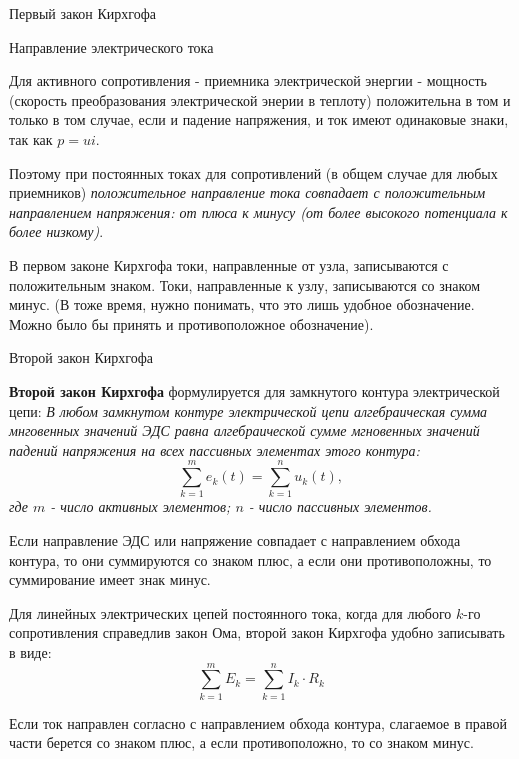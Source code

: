 \documentclass[10pt, pdf, hyperref={unicode},handout]{beamer}
\begin{document}
\begin{frame}{Первый закон Кирхгофа}
\begin{block}
{\begin{figure}[htb]
  \end{figure}
}

  \end{block}
  
\end{frame}

\begin{frame}{Направление электрического тока}
  \begin{block}

    \small{
      Для активного сопротивления - приемника электрической энергии - мощность (скорость преобразования электрической энерии в теплоту) положительна в том и только в том случае, если и падение напряжения, и ток имеют одинаковые знаки, так как $p=ui$.

      Поэтому при постоянных токах для сопротивлений (в общем случае для любых приемников) \textit{положительное направление тока совпадает с положительным направлением напряжения: от плюса к минусу (от более высокого потенциала к более низкому)}.

      В первом законе Кирхгофа токи, направленные от узла, записываются с положительным знаком. Токи, направленные к узлу, записываются со знаком минус. (В тоже время, нужно понимать, что это лишь удобное обозначение. Можно было бы принять и противоположное обозначение).
}

  \end{block}
  
\end{frame}

\begin{frame}{Второй закон Кирхгофа}
  \begin{block}

    \small{
      \textbf{Второй закон Кирхгофа} формулируется для замкнутого контура электрической цепи:
      \textit{В любом замкнутом контуре электрической цепи алгебраическая сумма мнговенных значений ЭДС равна алгебраической сумме мгновенных значений падений напряжения на всех пассивных элементах этого контура: $$\sum_{k=1}^{m}e_k(t)=\sum_{k=1}^{n}u_k(t),$$
        где $m$ - число активных элементов; $n$ - число пассивных элементов.
      }

      Если направление ЭДС или напряжение совпадает с направлением обхода контура, то они суммируются со знаком плюс, а если они противоположны, то суммирование имеет знак минус.

      Для линейных электрических цепей постоянного тока, когда для любого $k$-го сопротивления справедлив закон Ома, второй закон Кирхгофа удобно записывать в виде: $$\sum_{k=1}^{m} E_k=\sum_{k=1}^{n}I_k\cdot R_k$$

      Если ток направлен согласно с направлением обхода контура, слагаемое в правой части берется со знаком плюс, а если противоположно, то со знаком минус.
      
}

  \end{block}
  
\end{frame}
\end{document}
